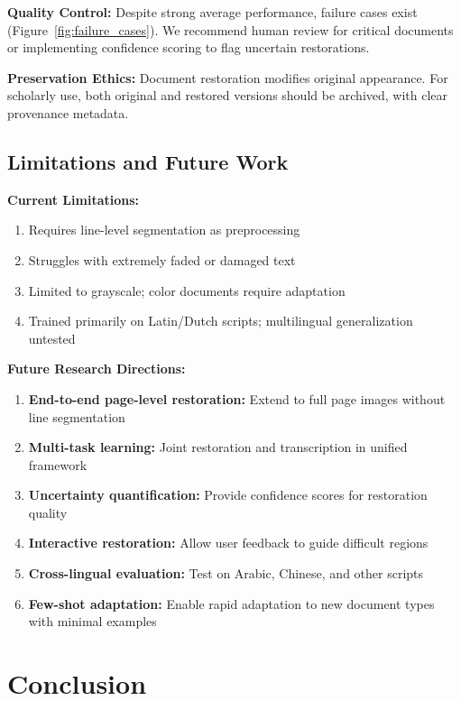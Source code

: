 \documentclass[journal]{IEEEtran}
\begin{document}
\textbf{Quality Control:} Despite strong average performance, failure cases exist (Figure~\ref{fig:failure_cases}). We recommend human review for critical documents or implementing confidence scoring to flag uncertain restorations.

\textbf{Preservation Ethics:} Document restoration modifies original appearance. For scholarly use, both original and restored versions should be archived, with clear provenance metadata.

\subsection{Limitations and Future Work}

\textbf{Current Limitations:}
\begin{enumerate}
    \item Requires line-level segmentation as preprocessing
    \item Struggles with extremely faded or damaged text
    \item Limited to grayscale; color documents require adaptation
    \item Trained primarily on Latin/Dutch scripts; multilingual generalization untested
\end{enumerate}

\textbf{Future Research Directions:}
\begin{enumerate}
    \item \textbf{End-to-end page-level restoration:} Extend to full page images without line segmentation
    \item \textbf{Multi-task learning:} Joint restoration and transcription in unified framework
    \item \textbf{Uncertainty quantification:} Provide confidence scores for restoration quality
    \item \textbf{Interactive restoration:} Allow user feedback to guide difficult regions
    \item \textbf{Cross-lingual evaluation:} Test on Arabic, Chinese, and other scripts
    \item \textbf{Few-shot adaptation:} Enable rapid adaptation to new document types with minimal examples
\end{enumerate}

\section{Conclusion}
\end{document}

